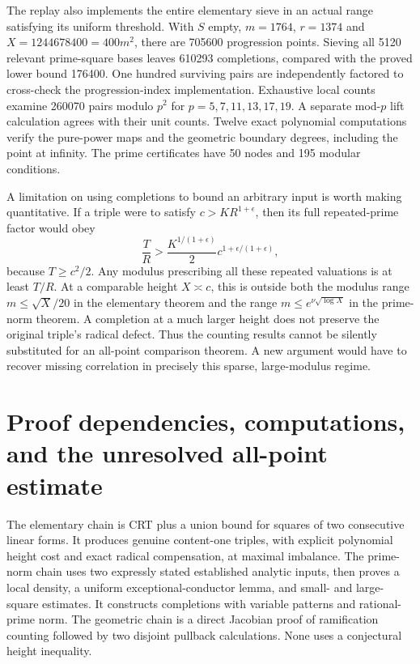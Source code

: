 The replay also implements the entire elementary sieve in an actual range
satisfying its uniform threshold. With $S$ empty, $m=1764$, $r=1374$ and
$X=1244678400=400m^2$, there are 705600 progression points. Sieving all
5120 relevant prime-square bases leaves 610293 completions, compared with
the proved lower bound 176400. One hundred surviving pairs are independently
factored to cross-check the progression-index implementation.
Exhaustive local counts examine 260070 pairs modulo $p^2$ for
$p=5,7,11,13,17,19$. A separate mod-$p$ lift calculation agrees with their
unit counts. Twelve exact polynomial computations verify the pure-power
maps and the geometric boundary degrees, including the point at infinity.
The prime certificates have 50 nodes and 195 modular conditions.

A limitation on using completions to bound an arbitrary input is worth
making quantitative. If a triple were to satisfy
$c>K R^{1+\epsilon}$, then its full repeated-prime factor would obey
\[
 \frac TR>
 \frac{K^{1/(1+\epsilon)}}2
 c^{1+\epsilon/(1+\epsilon)},
\]
because $T\ge c^2/2$. Any modulus prescribing all these repeated valuations
is at least $T/R$. At a comparable height $X\asymp c$, this is outside both
the modulus range $m\le\sqrt X/20$ in the elementary theorem and the range
$m\le e^{\nu\sqrt{\log X}}$ in the prime-norm theorem. A completion at a
much larger height does not preserve the original triple's radical defect.
Thus the counting results cannot be silently substituted for an all-point
comparison theorem. A new argument would have to recover missing correlation
in precisely this sparse, large-modulus regime.

\section{Proof dependencies, computations, and the unresolved all-point estimate}
\label{cr:audit}
The elementary chain is CRT plus a union bound for squares of two consecutive
linear forms. It produces genuine content-one triples, with explicit
polynomial height cost and exact radical compensation, at maximal imbalance.
The prime-norm chain uses two expressly stated established analytic inputs,
then proves a local density, a uniform exceptional-conductor lemma, and small-
and large-square estimates. It constructs completions with variable patterns
and rational-prime norm. The geometric chain is a direct Jacobian proof of
ramification counting followed by two disjoint pullback calculations. None
uses a conjectural height inequality.

